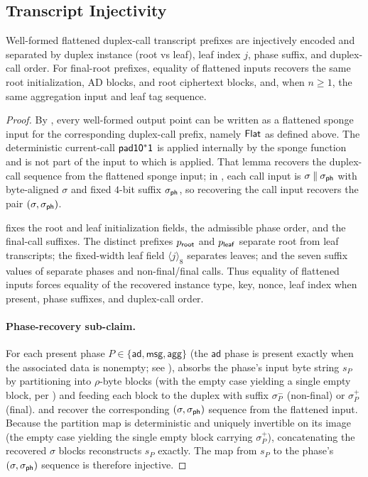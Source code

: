 \subsection{Transcript Injectivity}
\label{app:lem-transcript-inj}

\begin{lemma}
\label{lem:transcript-inj}
Well-formed \TW{} flattened duplex-call transcript prefixes are
injectively encoded and separated by duplex instance (root vs leaf),
leaf index $j$, phase suffix, and duplex-call order. For final-root
prefixes, equality of flattened inputs recovers the same root
initialization, AD blocks, and root ciphertext blocks, and, when
$n \geq 1$, the same aggregation input and leaf tag sequence.
\end{lemma}

\begin{proof}
By , every well-formed output point can be written
as a \cite{BDPV11} flattened sponge input for the corresponding
duplex-call prefix, namely $\mathsf{Flat}$ as defined above. The deterministic
current-call $\mathsf{pad10^*1}$ is applied internally by the sponge function
and is not part of the input to which \cite[Lemma~4]{BDPV11} is applied.
That lemma recovers the duplex-call sequence from the flattened sponge
input; in \TW{}, each call input is
$\sigma \concat \sigph$ with byte-aligned $\sigma$ and
fixed $4$-bit suffix $\sigph$, so recovering the call input recovers the pair
$(\sigma, \sigph)$.

 fixes the root and leaf initialization fields,
the admissible phase order, and the final-call suffixes. The distinct
prefixes $p_{\mathsf{root}}$ and $p_{\mathsf{leaf}}$ separate root from leaf transcripts;
the fixed-width leaf field $\langle j \rangle_8$ separates leaves; and
the seven suffix values of  separate phases and
non-final/final calls. Thus equality of flattened inputs forces equality
of the recovered instance type, key, nonce, leaf index when present,
phase suffixes, and duplex-call order.

\paragraph{Phase-recovery sub-claim.}
For each present phase $P \in \{\mathsf{ad}, \mathsf{msg}, \mathsf{agg}\}$
(the $\mathsf{ad}$ phase is present exactly when the associated data is
nonempty; see ),
\TW{} absorbs the phase's input byte string $s_P$ by partitioning into
$\rho$-byte blocks (with the empty case yielding a single empty block,
per ) and feeding each block to the duplex with suffix
$\sigma_P^-$ (non-final) or $\sigma_P^+$ (final).
 and \cite[Lemma~4]{BDPV11} recover the
corresponding $(\sigma, \sigph)$ sequence from the flattened input.
Because the partition map is deterministic and uniquely invertible on
its image (the empty case yielding the single empty block carrying
$\sigma_P^+$), concatenating the recovered $\sigma$ blocks
reconstructs $s_P$ exactly. The map from $s_P$ to the phase's $(\sigma,
\sigph)$ sequence is therefore injective.


\end{proof}
